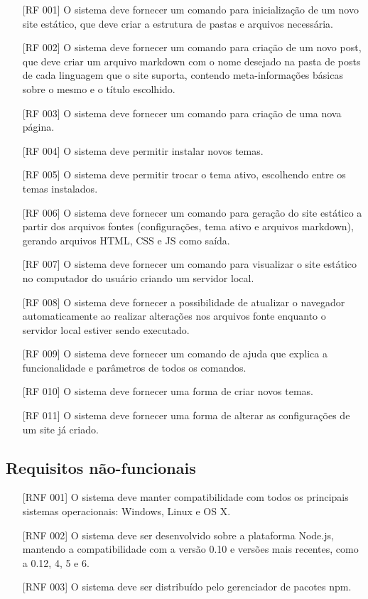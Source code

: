 \documentclass[ppginf, pep]{esinucpel}
\begin{document}
\begin{itemize}
\item [{[RF 001]}] O sistema deve fornecer um comando para inicialização de um novo site estático, que deve criar a estrutura de pastas e arquivos necessária.
\item [{[RF 002]}] O sistema deve fornecer um comando para criação de um novo post, que deve criar um arquivo markdown com o nome desejado na pasta de posts de cada linguagem que o site suporta, contendo meta-informações básicas sobre o mesmo e o título escolhido.
\item [{[RF 003]}] O sistema deve fornecer um comando para criação de uma nova página.
\item [{[RF 004]}] O sistema deve permitir instalar novos temas.
\item [{[RF 005]}] O sistema deve permitir trocar o tema ativo, escolhendo entre os temas instalados.
\item [{[RF 006]}] O sistema deve fornecer um comando para geração do site estático a partir dos arquivos fontes (configurações, tema ativo e arquivos markdown), gerando arquivos HTML, CSS e JS como saída.
\item [{[RF 007]}] O sistema deve fornecer um comando para visualizar o site estático no computador do usuário criando um servidor local.
\item [{[RF 008]}] O sistema deve fornecer a possibilidade de atualizar o navegador automaticamente ao realizar alterações nos arquivos fonte enquanto o servidor local estiver sendo executado.
\item [{[RF 009]}] O sistema deve fornecer um comando de ajuda que explica a funcionalidade e parâmetros de todos os comandos.
\item [{[RF 010]}] O sistema deve fornecer uma forma de criar novos temas.
\item [{[RF 011]}] O sistema deve fornecer uma forma de alterar as configurações de um site já criado.
\end{itemize}

\subsection{Requisitos não-funcionais}

\begin{itemize}
\item [{[RNF 001]}] O sistema deve manter compatibilidade com todos os principais sistemas operacionais: Windows, Linux e OS X.
\item [{[RNF 002]}] O sistema deve ser desenvolvido sobre a plataforma Node.js, mantendo a compatibilidade com a versão 0.10 e versões mais recentes, como a 0.12, 4, 5 e 6.
\item [{[RNF 003]}] O sistema deve ser distribuído pelo gerenciador de pacotes npm.
\end{itemize}
\end{document}

